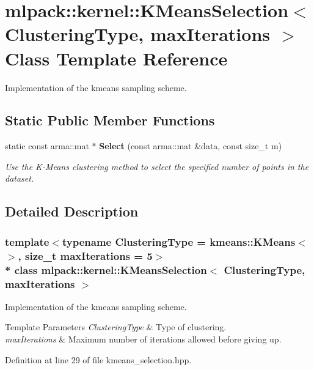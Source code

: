 \section{mlpack\+:\+:kernel\+:\+:K\+Means\+Selection$<$ Clustering\+Type, max\+Iterations $>$ Class Template Reference}
\label{classmlpack_1_1kernel_1_1KMeansSelection}


Implementation of the kmeans sampling scheme.  


\subsection*{Static Public Member Functions}
\begin{DoxyCompactItemize}
\item 
static const arma\+::mat $\ast$ {\bf Select} (const arma\+::mat \&data, const size\+\_\+t m)
\begin{DoxyCompactList}\small\item\em Use the K-\/\+Means clustering method to select the specified number of points in the dataset. \end{DoxyCompactList}\end{DoxyCompactItemize}


\subsection{Detailed Description}
\subsubsection*{template$<$typename Clustering\+Type = kmeans\+::\+K\+Means$<$$>$, size\+\_\+t max\+Iterations = 5$>$\\*
class mlpack\+::kernel\+::\+K\+Means\+Selection$<$ Clustering\+Type, max\+Iterations $>$}

Implementation of the kmeans sampling scheme. 


\begin{DoxyTemplParams}{Template Parameters}
{\em Clustering\+Type} & Type of clustering. \\
\hline
{\em max\+Iterations} & Maximum number of iterations allowed before giving up. \\
\hline
\end{DoxyTemplParams}


Definition at line 29 of file kmeans\+\_\+selection.\+hpp.



